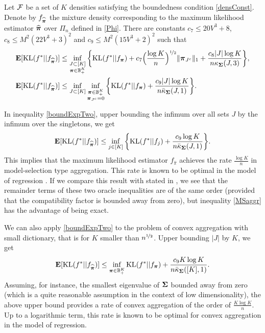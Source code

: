 \begin{theorem}
	\label{th:expectation}
	Let $\cal F$ be a set of $K$ densities satisfying the boundedness condition \eqref{densConst}.
	Denote by $f_{\widehat{\boldsymbol \pi}}$ the mixture density corresponding to the maximum likelihood estimator
	$\widehat{\boldsymbol \pi}$ over $\Pi_n$ defined in \eqref{Phi}. There are constants $c_7\le 20V^3 + 8$,
	$c_8\le M^2(22V^3+3)^2$ and $c_9\le M^2(15V^3+2)^2$ such that
	\begin{align}
	\mathbf E[{\rm KL}(f^*|| f_{\widehat{\boldsymbol \pi}})] &\leq \inf_{\substack{J\subset [K]\\ \boldsymbol \pi \in {\mathbb B}_+^K}}
	\bigg\{ {\rm KL}(f^*|| f_{\boldsymbol \pi}) + c_7\Big(\frac{\log K}{n}\Big)^{\nicefrac12} \|\boldsymbol \pi_{J^c}\|_1 +
	\frac{c_8|J|\log K}{n\kappa_{\boldsymbol\Sigma}(J,3)} \bigg\},\label{boundExpOne}\\
	\mathbf E[{\rm KL}(f^*|| f_{\widehat{\boldsymbol \pi}})] &\leq \inf_{J\subset [K]}\inf_{\substack{\boldsymbol \pi \in {\mathbb B}_+^K\\
			\boldsymbol \pi_{J^c}=0}} \bigg\{ {\rm KL}(f^*|| f_{\boldsymbol \pi}) +
	\frac{c_9|J|\log K}{n\bar\kappa_{\boldsymbol\Sigma}(J,1)} \bigg\}.\label{boundExpTwo}
	\end{align}
\end{theorem}

In inequality \eqref{boundExpTwo}, upper bounding the infimum over all sets $J$ by the infimum
over the singletons, we get
\begin{equation}
\mathbf E[{\rm KL}(f^*|| f_{\widehat{\boldsymbol \pi}})] \leq \inf_{j\in [K]}\bigg\{ {\rm KL}(f^*|| f_j) +
\frac{c_9\log K}{n\bar\kappa_{\boldsymbol\Sigma}(J,1)} \bigg\}.\label{MSaggr}
\end{equation}
This implies that the maximum likelihood estimator $f_{\hat\pi}$ achieves the
rate $\frac{\log K}{n}$ in model-selection type aggregation. This rate is known
to be optimal in the model of regression \citep{Rigollet12}. If we compare this result
with  stated in , we see that the remainder terms
of these two oracle inequalities are of the same order (provided that the compatibility
factor is bounded away from zero), but inequality \eqref{MSaggr} has the advantage
of being exact.

We can also apply  \eqref{boundExpTwo} to the problem of convex aggregation with
small dictionary, that is for $K$ smaller than  $n^{\nicefrac12}$. Upper bounding $|J|$ by $K$,
we get
\begin{equation}
\mathbf E[{\rm KL}(f^*|| f_{\widehat{\boldsymbol \pi}})] \leq \inf_{\boldsymbol \pi \in {\mathbb B}_+^K}
{\rm KL}(f^*|| f_{\boldsymbol \pi}) +\frac{c_9 K \log K}{n\bar\kappa_{\boldsymbol\Sigma}([K],1)}.
\label{Caggr}
\end{equation}
Assuming, for instance, the smallest eigenvalue of $\boldsymbol\Sigma$ bounded away from zero (which
is a quite reasonable assumption in the context of low dimensionality), the above upper
bound provides a rate of convex aggregation of the order of $\frac{K\log K}{n}$. Up to a
logarithmic term, this rate is known to be optimal for convex aggregation in the model of
regression.

